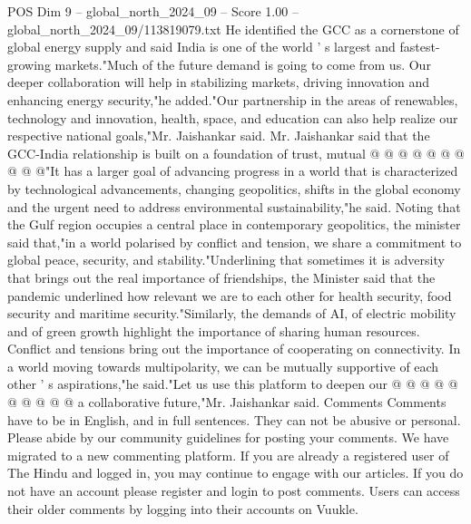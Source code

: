 \begin{textsample}{POS Dim 9 – global\_north\_2024\_09 – Score 1.00 – global\_north\_2024\_09/113819079.txt}
He identified the GCC as a cornerstone of global energy supply and said India is one of the world ' s largest and fastest-growing markets."Much of the future demand is going to come from us.
Our deeper collaboration will help in stabilizing markets, driving innovation and enhancing energy security,"he added."Our partnership in the areas of renewables, technology and innovation, health, space, and education can also help realize our respective national goals,"Mr.
Jaishankar said.
Mr.
Jaishankar said that the GCC-India relationship is built on a foundation of trust, mutual @ @ @ @ @ @ @ @ @ @"It has a larger goal of advancing progress in a world that is characterized by technological advancements, changing geopolitics, shifts in the global economy and the urgent need to address environmental sustainability,"he said.
Noting that the Gulf region occupies a central place in contemporary geopolitics, the minister said that,"in a world polarised by conflict and tension, we share a commitment to global peace, security, and stability."Underlining that sometimes it is adversity that brings out the real importance of friendships, the Minister said that the pandemic underlined how relevant we are to each other for health security, food security and maritime security."Similarly, the demands of AI, of electric mobility and of green growth highlight the importance of sharing human resources.
Conflict and tensions bring out the importance of cooperating on connectivity.
In a world moving towards multipolarity, we can be mutually supportive of each other ' s aspirations,"he said."Let us use this platform to deepen our @ @ @ @ @ @ @ @ @ @ a collaborative future,"Mr.
Jaishankar said.
Comments Comments have to be in English, and in full sentences.
They can not be abusive or personal.
Please abide by our community guidelines for posting your comments.
We have migrated to a new commenting platform.
If you are already a registered user of The Hindu and logged in, you may continue to engage with our articles.
If you do not have an account please register and login to post comments.
Users can access their older comments by logging into their accounts on Vuukle.

\end{textsample}
